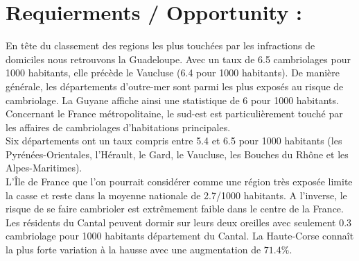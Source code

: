 \chapter{Requierments / Opportunity :}

En tête du classement des regions les plus touchées par les infractions de domiciles nous retrouvons la Guadeloupe. Avec un taux de 6.5 cambriolages pour 1000 habitants, elle précède le Vaucluse (6.4 pour 1000 habitants). De manière générale, les départements d’outre-mer sont parmi les plus exposés au risque de cambriolage. La Guyane affiche ainsi une statistique de 6 pour 1000 habitants. Concernant le France métropolitaine, le sud-est est particulièrement touché par les affaires de cambriolages d’habitations principales.\\

Six départements ont un taux compris entre 5.4 et 6.5 pour 1000 habitants (les Pyrénées-Orientales, l’Hérault, le Gard, le Vaucluse, les Bouches du Rhône et les Alpes-Maritimes).\\

L’Île de France que l’on pourrait considérer comme une région très exposée limite la casse et reste dans la moyenne nationale de 2.7/1000 habitants. A l’inverse, le risque de se faire cambrioler est extrêmement faible dans le centre de la France. Les résidents du Cantal peuvent dormir sur leurs deux oreilles avec seulement 0.3 cambriolage pour 1000 habitants département du Cantal. La Haute-Corse connaît la plus forte variation à la hausse avec une augmentation de $71.4\%$.\cite{www:ondrp}\\
